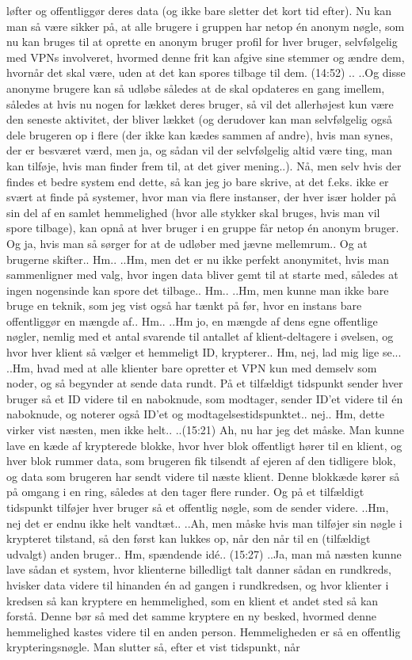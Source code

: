 \documentclass{article}
\begin{document}
løfter og offentliggør deres data (og ikke bare sletter det kort tid efter). Nu kan man så være sikker på, at alle brugere i gruppen har netop én anonym nøgle, som nu kan bruges til at oprette en anonym bruger profil for hver bruger, selvfølgelig med VPNs involveret, hvormed denne frit kan afgive sine stemmer og ændre dem, hvornår det skal være, uden at det kan spores tilbage til dem. (14:52) .. ..Og disse anonyme brugere kan så udløbe således at de skal opdateres en gang imellem, således at hvis nu nogen for lækket deres bruger, så vil det allerhøjest kun være den seneste aktivitet, der bliver lækket (og derudover kan man selvfølgelig også dele brugeren op i flere (der ikke kan kædes sammen af andre), hvis man synes, der er besværet værd, men ja, og sådan vil der selvfølgelig altid være ting, man kan tilføje, hvis man finder frem til, at det giver mening..). Nå, men selv hvis der findes et bedre system end dette, så kan jeg jo bare skrive, at det f.eks. ikke er svært at finde på systemer, hvor man via flere instanser, der hver især holder på sin del af en samlet hemmelighed (hvor alle stykker skal bruges, hvis man vil spore tilbage), kan opnå at hver bruger i en gruppe får netop én anonym bruger. Og ja, hvis man så sørger for at de udløber med jævne mellemrum.. Og at brugerne skifter.. Hm.. ..Hm, men det er nu ikke perfekt anonymitet, hvis man sammenligner med valg, hvor ingen data bliver gemt til at starte med, således at ingen nogensinde kan spore det tilbage.. Hm.. ..Hm, men kunne man ikke bare bruge en teknik, som jeg vist også har tænkt på før, hvor en instans bare offentliggør en mængde af.. Hm.. ..Hm jo, en mængde af dens egne offentlige nøgler, nemlig med et antal svarende til antallet af klient-deltagere i øvelsen, og hvor hver klient så vælger et hemmeligt ID, krypterer.. Hm, nej, lad mig lige se... ..Hm, hvad med at alle klienter bare opretter et VPN kun med demselv som noder, og så begynder at sende data rundt. På et tilfældigt tidspunkt sender hver bruger så et ID videre til en naboknude, som modtager, sender ID'et videre til én naboknude, og noterer også ID'et og modtagelsestidspunktet.. nej.. Hm, dette virker vist næsten, men ikke helt.. ..(15:21) Ah, nu har jeg det måske. Man kunne lave en kæde af krypterede blokke, hvor hver blok offentligt hører til en klient, og hver blok rummer data, som brugeren fik tilsendt af ejeren af den tidligere blok, og data som brugeren har sendt videre til næste klient. Denne blokkæde kører så på omgang i en ring, således at den tager flere runder. Og på et tilfældigt tidspunkt tilføjer hver bruger så et offentlig nøgle, som de sender videre. ..Hm, nej det er endnu ikke helt vandtæt.. ..Ah, men måske hvis man tilføjer sin nøgle i krypteret tilstand, så den først kan lukkes op, når den når til en (tilfældigt udvalgt) anden bruger.. Hm, spændende idé.. (15:27) ..Ja, man må næsten kunne lave sådan et system, hvor klienterne billedligt talt danner sådan en rundkreds, hvisker data videre til hinanden én ad gangen i rundkredsen, og hvor klienter i kredsen så kan kryptere en hemmelighed, som en klient et andet sted så kan forstå. Denne bør så med det samme kryptere en ny besked, hvormed denne hemmelighed kastes videre til en anden person. Hemmeligheden er så en offentlig krypteringsnøgle. Man slutter så, efter et vist tidspunkt, når 
\end{document}
